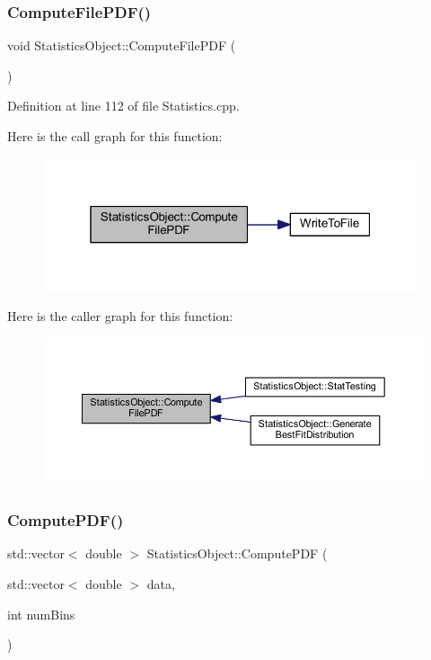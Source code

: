 \subsubsection{\texorpdfstring{Compute\+File\+P\+D\+F()}{ComputeFilePDF()}}
{\footnotesize\ttfamily void Statistics\+Object\+::\+Compute\+File\+P\+DF (\begin{DoxyParamCaption}{ }\end{DoxyParamCaption})}



Definition at line 112 of file Statistics.\+cpp.

Here is the call graph for this function\+:
\nopagebreak
\begin{figure}[H]
\begin{center}
\leavevmode
\includegraphics[width=313pt]{class_statistics_object_a7954e7f69391099bbc33c139149ebb15_cgraph}
\end{center}
\end{figure}
Here is the caller graph for this function\+:
\nopagebreak
\begin{figure}[H]
\begin{center}
\leavevmode
\includegraphics[width=350pt]{class_statistics_object_a7954e7f69391099bbc33c139149ebb15_icgraph}
\end{center}
\end{figure}
\mbox{\label{class_statistics_object_ad89d69d36051851fe876b1ec28967c1e}} 
\subsubsection{\texorpdfstring{Compute\+P\+D\+F()}{ComputePDF()}}
{\footnotesize\ttfamily std\+::vector$<$ double $>$ Statistics\+Object\+::\+Compute\+P\+DF (\begin{DoxyParamCaption}\item[{std\+::vector$<$ double $>$}]{data,  }\item[{int}]{num\+Bins }\end{DoxyParamCaption})}



